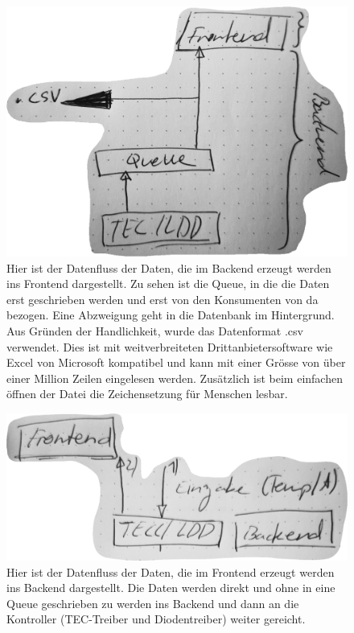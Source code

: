 \begin{figure}
    \centering
    \includegraphics{98_images/data_flow_backend_frontend_tec_ldd.PNG}
    \caption{Hier ist der Datenfluss der Daten, die im Backend erzeugt werden ins Frontend dargestellt. Zu sehen ist die Queue, in die die Daten erst geschrieben werden und erst von den Konsumenten von da bezogen. Eine Abzweigung geht in die Datenbank im Hintergrund. Aus Gründen der Handlichkeit, wurde das Datenformat .csv verwendet. Dies ist mit weitverbreiteten Drittanbietersoftware wie Excel von Microsoft kompatibel und kann mit einer Grösse von über einer Million Zeilen eingelesen werden. Zusätzlich ist beim einfachen öffnen der Datei die Zeichensetzung für Menschen lesbar. }
    \label{fig:dataflow_1}
\end{figure}

\begin{figure}
    \centering
    \includegraphics{98_images/data_flow_frontend_backend_tec_ldd.PNG}
    \caption{Hier ist der Datenfluss der Daten, die im Frontend erzeugt werden ins Backend dargestellt. Die Daten werden direkt und ohne in eine Queue geschrieben zu werden ins Backend und dann an die Kontroller (TEC-Treiber und Diodentreiber) weiter gereicht.}
    \label{fig:dataflow_2}
\end{figure}


